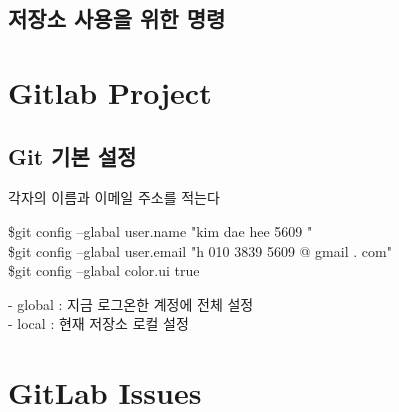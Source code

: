 \documentclass[12pt, a4paper, oneside]{book}
\let\stdsection\section
\renewcommand\section{\newpage\stdsection}
\begin{document}
%	
	\section 	{저장소 사용을 위한 명령}


	\chapter {Gitlab Project}
	\noptcrule

	\minitoc

%	
	\section 	{ Git 기본 설정}


	각자의 이름과 이메일 주소를 적는다


		\begin{tcolorbox}		[
								colback=red!5!white,
								colframe=red!75!black,
								title=깃 기본 설정
								]
			\$git config --glabal user.name  "kim dae hee 5609 " \\
			\$git config --glabal user.email  "h 010 3839 5609 @ gmail . com" \\
			\$git config --glabal color.ui true
		\end{tcolorbox}


		\begin{tcolorbox}
			- global : 지금 로그온한 계정에 전체 설정 \\
			- local : 현재 저장소 로컬 설정
		\end{tcolorbox}



	\chapter 	{GitLab Issues}
\end{document}
